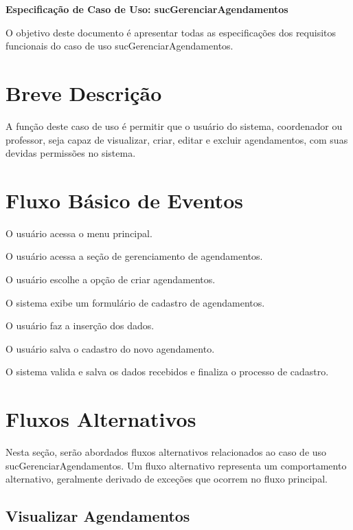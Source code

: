 \documentclass[12pt,a4paper]{article}
\newcommand{\ucnome}{sucGerenciarAgendamentos}
\newcommand{\uctitulo}{Especificação de Caso de Uso: \ucnome}
\begin{document}

\begin{center}
  {\Large\bfseries \uctitulo}
\end{center}

\vspace{0.5\baselineskip}

O objetivo deste documento é apresentar todas as especificações dos requisitos
funcionais do caso de uso \ucnome.

\section{Breve Descrição}

A função deste caso de uso é permitir que o usuário do sistema, coordenador ou
professor, seja capaz de visualizar, criar, editar e excluir agendamentos, com
suas devidas permissões no sistema.

\section{Fluxo Básico de Eventos}

\begin{fluxo}
  \item O usuário acessa o menu principal.
  \item O usuário acessa a seção de gerenciamento de agendamentos.
  \item O usuário escolhe a opção de criar agendamentos.
  \item O sistema exibe um formulário de cadastro de agendamentos.
  \item O usuário faz a inserção dos dados.
  \item O usuário salva o cadastro do novo agendamento.
  \item O sistema valida e salva os dados recebidos e finaliza o processo de
        cadastro.
\end{fluxo}

\section{Fluxos Alternativos}

Nesta seção, serão abordados fluxos alternativos relacionados ao caso de uso
\ucnome. Um fluxo alternativo representa um comportamento alternativo,
geralmente derivado de exceções que ocorrem no fluxo principal.

\subsection{Visualizar Agendamentos}
\end{document}
